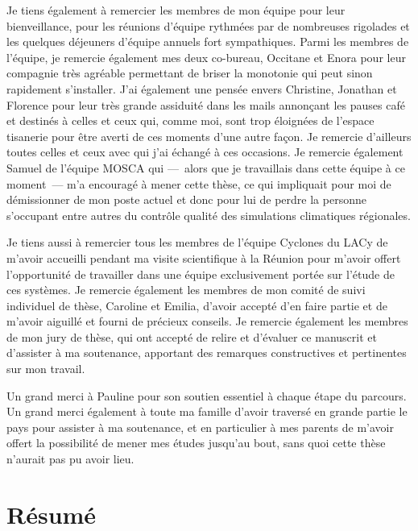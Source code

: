 \documentclass[12pt,twoside,openright]{book}
\begin{document}
\begin{acknowledgements}
            Je tiens également à remercier les membres de mon équipe pour leur bienveillance, pour les réunions d'équipe rythmées par de nombreuses rigolades et
            les quelques déjeuners d'équipe annuels fort sympathiques. Parmi les membres de l'équipe, je remercie également mes deux co-bureau, Occitane et
            Enora pour leur compagnie très agréable permettant de briser la monotonie qui peut sinon rapidement s'installer. J'ai également une pensée envers
            Christine, Jonathan et Florence pour leur très grande assiduité dans les mails annonçant les pauses café et destinés à celles et ceux qui, comme
            moi, sont trop éloigné\textperiodcentered es de l'espace tisanerie pour être averti de ces moments d'une autre façon. Je remercie d'ailleurs toutes
            celles et ceux avec qui j'ai échangé à ces occasions. Je remercie également Samuel de l'équipe MOSCA qui ---~alors que je travaillais dans cette
            équipe à ce moment~--- m'a encouragé à mener cette thèse, ce qui impliquait pour moi de démissionner de mon poste actuel et donc pour lui de
            perdre la personne s'occupant entre autres du contrôle qualité des simulations climatiques régionales.

            Je tiens aussi à remercier tous les membres de l'équipe Cyclones du LACy de m'avoir accueilli pendant ma visite scientifique à la Réunion pour
            m'avoir offert l'opportunité de travailler dans une équipe exclusivement portée sur l'étude de ces systèmes. Je remercie également les membres de
            mon comité de suivi individuel de thèse, Caroline et Emilia, d'avoir accepté d'en faire partie et de m'avoir aiguillé et fourni de précieux
            conseils. Je remercie également les membres de mon jury de thèse, qui ont accepté de relire et d'évaluer ce manuscrit et d'assister à ma soutenance,
            apportant des remarques constructives et pertinentes sur mon travail.

            Un grand merci à Pauline pour son soutien essentiel à chaque étape du parcours. Un grand merci également à toute ma famille d'avoir traversé en
            grande partie le pays pour assister à ma soutenance, et en particulier à mes parents de m'avoir offert la possibilité de mener mes études jusqu'au
            bout, sans quoi cette thèse n'aurait pas pu avoir lieu.
        \end{acknowledgements}

\chapter*{Résumé}
\vspace{-1cm}
\end{document}
